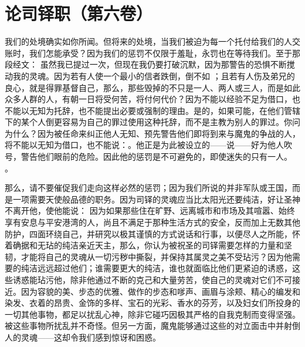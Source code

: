 

\section{论司铎职（第六卷）}

我们的处境确实如你所闻。但将来的处境，当我们被迫为每一个托付给我们的人交账时，我们怎能承受？因为我们的惩罚不仅限于羞耻，永罚也在等待我们。至于那段经文：  虽然我已提过一次，但现在我仍要打破沉默，因为那警告的恐惧不断搅动我的灵魂。因为若有人使一个最小的信者跌倒，倒不如 ；且若有人伤及弟兄的良心，就是得罪基督自己，那么，那些毁掉的不只是一人、两人或三人，而是如此众多人群的人，有朝一日将受何苦，将付何代价？因为不能以经验不足为借口，也不能以无知为托辞，也不能提出必要或强制的理由。是的，如果可能，在他们管辖下的某个人倒更容易为自己的罪过使用这种托辞，而不是主教为别人的罪过。你问为什么？因为被任命来纠正他人无知、预先警告他们即将到来与魔鬼的争战的人，将不能以无知为借口，也不能说：。他正是为此被设立的——说——好为他人吹号，警告他们眼前的危险。因此他的惩罚是不可避免的，即使迷失的只有一人。 。\par

那么，请不要催促我们走向这样必然的惩罚；因为我们所说的并非军队或王国，而是一项需要天使般品德的职务。因为司铎的灵魂应当比太阳光还要纯洁，好让圣神不离开他，使他能说：  因为如果那些住在旷野、远离城市和市场及其喧嚣、始终享有安息与平安港湾的人，尚且不满足于那种生活方式的安全，反而加上无数其他防护，四面环绕自己，并研究以极其谨慎的方式说话和行事，以便尽人之所能，怀着确据和无玷的纯洁亲近天主，那么，你认为被祝圣的司铎需要怎样的力量和坚韧，才能将自己的灵魂从一切污秽中撕裂，并保持其属灵之美不受玷污？因为他需要的纯洁远远超过他们；谁需要更大的纯洁，谁也就面临比他们更紧迫的诱惑，这些诱惑能玷污他，除非他通过不断的克己和大量劳苦，使自己的灵魂对它们不可接近。因为容貌的美、步态的优雅、做作的步态和嗲声、画眉与涂颊、精心的编发和染发、衣着的昂贵、金饰的多样、宝石的光彩、香水的芬芳，以及妇女们所投身的一切其他事物，都足以扰乱心神，除非它碰巧因极其严格的自我克制而变得坚强。被这些事物所扰乱并不奇怪。但另一方面，魔鬼能够通过这些的对立面击中并射倒人的灵魂——这却令我们感到惊讶和困惑。\par

